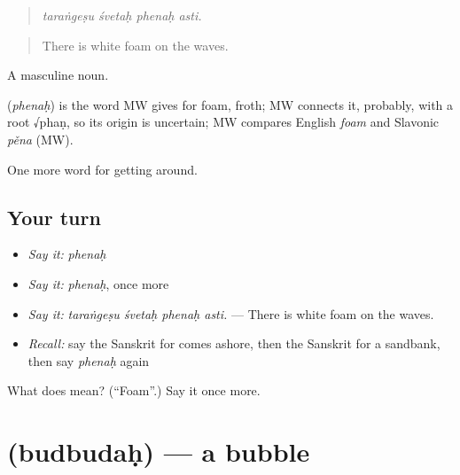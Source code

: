 \begin{quote}
   
\end{quote}

\begin{quote}
\emph{taraṅgeṣu śvetaḥ phenaḥ asti.}
\end{quote}

\begin{quote}
There is white foam on the waves.
\end{quote}

A masculine noun.

\begin{cousinweb}
\textbf{} (\emph{phenaḥ}) is the word MW gives for foam, froth; MW connects it, probably, with a root √phaṇ, so its origin is uncertain; MW compares English \emph{foam} and Slavonic \emph{pěna} (MW).
\end{cousinweb}

\begin{grammarlens}[title={What you've built}]
One more word for getting around.
\end{grammarlens}

\subsection*{Your turn}
\begin{itemize}
\raggedright
  \item \emph{Say it:} \emph{phenaḥ}
  \item \emph{Say it:} \emph{phenaḥ}, once more
  \item \emph{Say it:} \emph{taraṅgeṣu śvetaḥ phenaḥ asti.} — There is white foam on the waves.
  \item \emph{Recall:} say the Sanskrit for comes ashore, then the Sanskrit for a sandbank, then say \emph{phenaḥ} again
\end{itemize}

\begin{tcolorbox}[breakable,colback=teal!4,colframe=teal!35!black,title={Before you move on}]
What does  mean? (\textquotedblleft{}Foam\textquotedblright{}.) Say it once more.
\end{tcolorbox}
\section[\texorpdfstring{\sk{बुद्बुदः} (budbudaḥ)}{बुद्बुदः (budbudaḥ)}]{ (budbudaḥ) — a bubble}

